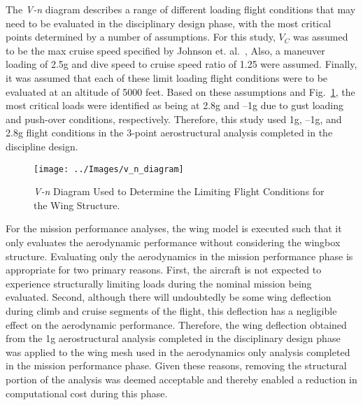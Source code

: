 The \textit{V-n} diagram describes a range of different loading flight conditions that may need to be evaluated in the disciplinary design phase, with the most critical points determined by a number of assumptions.
For this study, $V_C$ was assumed to be the max cruise speed specified by Johnson et. al.~\cite{johnson2018concept},
Also, a maneuver loading of 2.5g and dive speed to cruise speed ratio of 1.25 were assumed.
Finally, it was assumed that each of these limit loading flight conditions were to be evaluated at an altitude of 5000 feet.
Based on these assumptions and Fig.~\ref{f:v_n_diagram}, the most critical loads were identified as being at 2.8g and --1g due to gust loading and push-over conditions, respectively.
Therefore, this study used 1g, --1g, and 2.8g flight conditions in the 3-point aerostructural analysis completed in the discipline design.

\begin{figure}[htb]
\begin{center}
 \texttt{[image: ../Images/v\_n\_diagram]}
 \caption{\textit{V-n} Diagram Used to Determine the Limiting Flight Conditions for the Wing Structure.}
 \label{f:v_n_diagram}
\end{center}
\end{figure}

For the mission performance analyses, the wing model is executed such that it only evaluates the aerodynamic performance without considering the wingbox structure.
Evaluating only the aerodynamics in the mission performance phase is appropriate for two primary reasons.
First, the aircraft is not expected to experience structurally limiting loads during the nominal mission being evaluated.
Second, although there will undoubtedly be some wing deflection during climb and cruise segments of the flight, this deflection has a negligible effect on the aerodynamic performance.
Therefore, the wing deflection obtained from the 1g aerostructural analysis completed in the disciplinary design phase was applied to the wing mesh used in the aerodynamics only analysis completed in the mission performance phase.
Given these reasons, removing the structural portion of the analysis was deemed acceptable and thereby enabled a reduction in computational cost during this phase.
